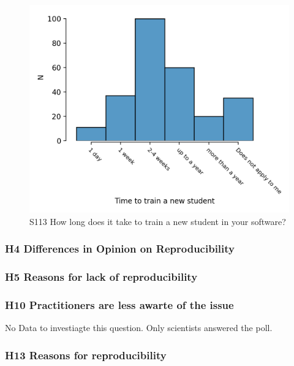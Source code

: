 \documentclass{article}
\begin{document}
\begin{figure}[!p]
    \centering
    \includegraphics[width=\textwidth]{../figs/S113.png}
	\caption{S113 How long does it take to train a new student in your software?}
    \label{fig:S113}
\end{figure}

\newpage

\subsubsection{H4 Differences in Opinion on Reproducibility}



\subsubsection{H5 Reasons for lack of reproducibility}



\subsubsection{H10 Practitioners are less awarte of the issue}

No Data to investiagte this question. Only scientists answered the poll.

\subsubsection{H13 Reasons for reproducibility}
\end{document}
